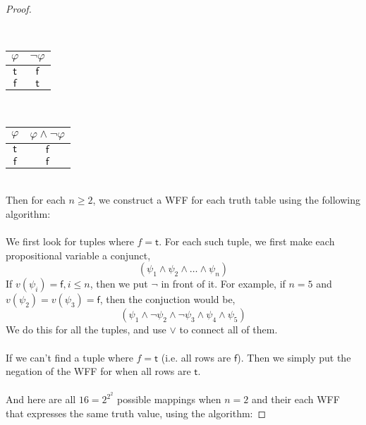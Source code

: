 \documentclass[12pt]{article}
\begin{document}
\begin{proof}
\begin{center}
        ~~~
        \begin{tabular}{c|c}
            $\varphi$ & $\neg \varphi$\\ \hline
            $\mathsf{t}$ & $\mathsf{f}$\\
            $\mathsf{f}$ & $\mathsf{t}$\\
        \end{tabular}
        ~~~
        \begin{tabular}{c|c}
            $\varphi$ & $\varphi \land \neg \varphi$\\ \hline
            $\mathsf{t}$ & $\mathsf{f}$\\
            $\mathsf{f}$ & $\mathsf{f}$\\
        \end{tabular}
    \end{center}
    $$$$\\
    Then for each $n \geq 2$, we construct a WFF for each truth table using the following algorithm:\\
    \\
    We first look for tuples where $f = \mathsf{t}$.
    For each such tuple, we first make each propositional variable a conjunct,
    $$(\psi_1 \land \psi_2 \land \dots \land \psi_n)$$
    If $v(\psi_i) = \mathsf{f}, i \leq n$, then we put $\neg$ in front of it.
    For example, if $n = 5$ and $v(\psi_2) = v(\psi_3) = \mathsf{f}$, then the conjuction would be,
    $$(\psi_1 \land \neg \psi_2 \land \neg \psi_3 \land \psi_4 \land \psi_5)$$
    We do this for all the tuples, and use $\lor$ to connect all of them.\\
    \\
    If we can't find a tuple where $f = \mathsf{t}$ (i.e. all rows are $\mathsf{f}$).
    Then we simply put the negation of the WFF for when all rows are $\mathsf{t}$.\\
    \\
    And here are all $16 = 2^{2^2}$ possible mappings when $n = 2$ and their each WFF that expresses the same truth value, using the algorithm:


\end{proof}
\end{document}
